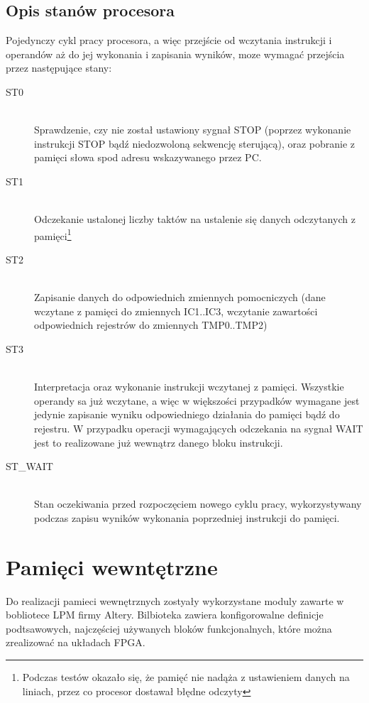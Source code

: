 \documentclass[a4paper,12pt]{report}
\begin{document}
\subsection{Opis stanów procesora}
Pojedynczy cykl pracy procesora, a więc przejście od wczytania instrukcji i operandów aż do jej wykonania i zapisania wyników, moze wymagać przejścia przez następujące stany:
\begin{description}
\item[ST0] \hfill \\
Sprawdzenie, czy nie został ustawiony sygnał STOP (poprzez wykonanie instrukcji STOP bądź niedozwoloną sekwencję sterującą), oraz pobranie z pamięci słowa spod adresu wskazywanego przez PC.
\item[ST1] \hfill \\
Odczekanie ustalonej liczby taktów na ustalenie się danych odczytanych z pamięci\footnote{Podczas testów okazało się, że pamięć nie nadąża z ustawieniem danych na liniach, przez co procesor dostawał błędne odczyty}
\item[ST2] \hfill \\
Zapisanie danych do odpowiednich zmiennych pomocniczych (dane wczytane z pamięci do zmiennych IC1..IC3, wczytanie zawartości odpowiednich rejestrów do zmiennych TMP0..TMP2)
\item[ST3] \hfill \\
Interpretacja oraz wykonanie instrukcji wczytanej z pamięci. Wszystkie operandy sa już wczytane, a więc w większości przypadków wymagane jest jedynie zapisanie wyniku odpowiedniego działania do pamięci bądź do rejestru. W przypadku operacji wymagających odczekania na sygnał WAIT jest to realizowane już wewnątrz danego bloku instrukcji.
\item[ST\_WAIT] \hfill \\
Stan oczekiwania przed rozpoczęciem nowego cyklu pracy, wykorzystywany podczas zapisu wyników wykonania poprzedniej instrukcji do pamięci.
\end{description}

\section{Pamięci wewntętrzne}
Do realizacji pamieci wewnętrznych zostyały wykorzystane moduly zawarte w  bobliotece LPM firmy Altery. Bilbioteka zawiera konfigorowalne definicje podtsawowych, najczęściej używanych bloków funkcjonalnych, które można zrealizować na układach FPGA.
\end{document}
